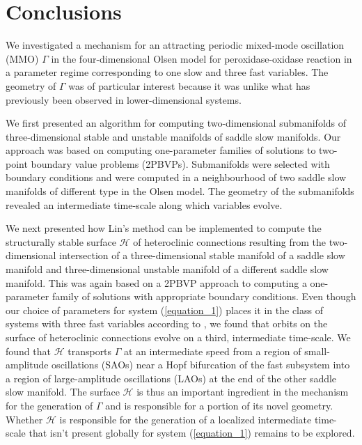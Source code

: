 \documentclass{ws-ijbc}
\begin{document}
\newpage

\section{Conclusions}

We investigated a mechanism for an attracting periodic mixed-mode oscillation (MMO) $\Gamma$ in the four-dimensional Olsen model for peroxidase-oxidase reaction in a parameter regime corresponding to one slow and three fast variables.  The geometry of $\Gamma$ was of particular interest because it was unlike what has previously been observed in lower-dimensional systems.

We first presented an algorithm for computing two-dimensional submanifolds of three-dimensional stable and unstable manifolds of saddle slow manifolds.  Our approach was based on computing one-parameter families of solutions to two-point boundary value problems (2PBVPs).  Submanifolds were selected with boundary conditions and were computed in a neighbourhood of two saddle slow manifolds of different type in the Olsen model.  The geometry of the submanifolds revealed an intermediate time-scale along which variables evolve.

We next presented how Lin's method can be implemented to compute the structurally stable surface $\mathscr{H}$ of heteroclinic connections resulting from the two-dimensional intersection of a three-dimensional stable manifold of a saddle slow manifold and three-dimensional unstable manifold of a different saddle slow manifold.  This was again based on a 2PBVP approach to computing a one-parameter family of solutions with appropriate boundary conditions.  Even though our choice of parameters for system (\ref{equation_1}) places it in the class of systems with three fast variables according to \cite{Rescaling}, we found that orbits on the surface of heteroclinic connections evolve on a third, intermediate time-scale.  We found that $\mathscr{H}$ transports $\Gamma$ at an intermediate speed from a region of small-amplitude oscillations (SAOs) near a Hopf bifurcation of the fast subsystem into a region of large-amplitude oscillations (LAOs) at the end of the other saddle slow manifold.  The surface $\mathscr{H}$ is thus an important ingredient in the mechanism for the generation of $\Gamma$ and is responsible for a portion of its novel geometry.  Whether $\mathscr{H}$ is responsible for the generation of a localized intermediate time-scale that isn't present globally for system (\ref{equation_1}) remains to be explored.
\end{document}
